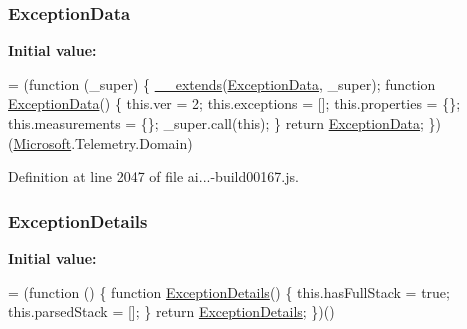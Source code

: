 \subsubsection[{\texorpdfstring{Exception\+Data}{ExceptionData}}]{ Exception\+Data}\hypertarget{_scripts_2ai_80_822_89-build00167_8js_ad9d17c4a3d7a2a475f6059d400fa1671}{}\label{_scripts_2ai_80_822_89-build00167_8js_ad9d17c4a3d7a2a475f6059d400fa1671}
{\bfseries Initial value\+:}
\begin{DoxyCode}
= (\textcolor{keyword}{function} (\_super) \{
        \hyperlink{obj_2_release_2_package_2_package_tmp_2_scripts_2ai_80_822_89-build00167_8js_ac09f4951ac4b25df0272d4e78ff85ae0}{\_\_extends}(\hyperlink{obj_2_release_2_package_2_package_tmp_2_scripts_2ai_80_822_89-build00167_8js_ad9d17c4a3d7a2a475f6059d400fa1671}{ExceptionData}, \_super);
        \textcolor{keyword}{function} \hyperlink{obj_2_release_2_package_2_package_tmp_2_scripts_2ai_80_822_89-build00167_8js_ad9d17c4a3d7a2a475f6059d400fa1671}{ExceptionData}() \{
            this.ver = 2;
            this.exceptions = [];
            this.properties = \{\};
            this.measurements = \{\};
            \_super.call(\textcolor{keyword}{this});
        \}
        \textcolor{keywordflow}{return} \hyperlink{obj_2_release_2_package_2_package_tmp_2_scripts_2ai_80_822_89-build00167_8js_ad9d17c4a3d7a2a475f6059d400fa1671}{ExceptionData};
    \})(\hyperlink{obj_2_release_2_package_2_package_tmp_2_scripts_2ai_80_822_89-build00167_8js_af7b21097393c8dc2ece8949358ff0e27}{Microsoft}.Telemetry.Domain)
\end{DoxyCode}


Definition at line 2047 of file ai...-\/build00167.\+js.

\subsubsection[{\texorpdfstring{Exception\+Details}{ExceptionDetails}}]{ Exception\+Details}\hypertarget{_scripts_2ai_80_822_89-build00167_8js_a7f7a19d048e084f626f1c757d98f10a2}{}\label{_scripts_2ai_80_822_89-build00167_8js_a7f7a19d048e084f626f1c757d98f10a2}
{\bfseries Initial value\+:}
\begin{DoxyCode}
= (\textcolor{keyword}{function} () \{
        \textcolor{keyword}{function} \hyperlink{obj_2_release_2_package_2_package_tmp_2_scripts_2ai_80_822_89-build00167_8js_a7f7a19d048e084f626f1c757d98f10a2}{ExceptionDetails}() \{
            this.hasFullStack = \textcolor{keyword}{true};
            this.parsedStack = [];
        \}
        \textcolor{keywordflow}{return} \hyperlink{obj_2_release_2_package_2_package_tmp_2_scripts_2ai_80_822_89-build00167_8js_a7f7a19d048e084f626f1c757d98f10a2}{ExceptionDetails};
    \})()
\end{DoxyCode}


